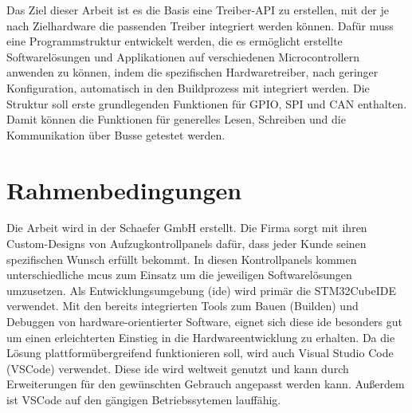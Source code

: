 Das Ziel dieser Arbeit ist es die Basis eine Treiber-API zu erstellen, mit der je nach Zielhardware die passenden Treiber integriert werden können.
Dafür muss eine Programmstruktur entwickelt werden, die es ermöglicht erstellte Softwarelösungen und Applikationen auf verschiedenen Microcontrollern anwenden zu können, indem die spezifischen Hardwaretreiber, nach geringer Konfiguration, automatisch in den Buildprozess mit integriert werden.
Die Struktur soll erste grundlegenden Funktionen für GPIO, SPI und CAN enthalten. 
Damit können die Funktionen für generelles Lesen, Schreiben und die Kommunikation über Busse getestet werden.


\section{Rahmenbedingungen} \label{chap2_rahmenbedingungen}
Die Arbeit wird in der Schaefer GmbH erstellt. 
Die Firma sorgt mit ihren Custom-Designs von Aufzugkontrollpanels dafür, dass jeder Kunde seinen spezifischen Wunsch erfüllt bekommt.
In diesen Kontrollpanels kommen unterschiedliche \gls{mcu}s zum Einsatz um die jeweiligen Softwarelösungen umzusetzen.
Als Entwicklungsumgebung (\gls{ide}) wird primär die STM32CubeIDE verwendet.
Mit den bereits integrierten Tools zum Bauen (Builden) und Debuggen von hardware-orientierter Software, eignet sich diese \gls{ide} besonders gut um einen erleichterten Einstieg in die Hardwareentwicklung zu erhalten.
Da die Lösung plattformübergreifend funktionieren soll, wird auch Visual Studio Code (VSCode) verwendet.
Diese \gls{ide} wird weltweit genutzt und kann durch Erweiterungen für den gewünschten Gebrauch angepasst werden kann. 
Außerdem ist VSCode auf den gängigen Betriebssytemen lauffähig.

